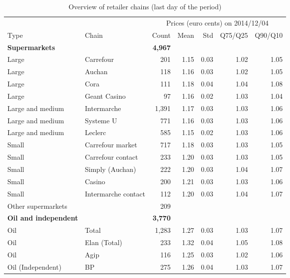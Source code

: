 \documentclass[english]{article}
\begin{document}
\begin{table}[H]
\begin{threeparttable}
\renewcommand{\arraystretch}{0.8} %
\caption{Overview of retailer chains (last day of the period)}
\label{tab:station_chains}
    \begin{tabular}{llrrrrr}
    \hline
		\hline
          &       & \multicolumn{5}{c}{Prices (euro cents) on 2014/12/04} \\
    Type  & Chain & Count & Mean  & Std   & Q75/Q25 & Q90/Q10 \\
		\hline
    \textbf{Supermarkets} &       & \textbf{4,967} &       &       &       &  \\
    Large & Carrefour & 201   & 1.15  & 0.03  & 1.02  & 1.05 \\
    Large & Auchan & 118   & 1.16  & 0.03  & 1.02  & 1.05 \\
    Large & Cora  & 111   & 1.18  & 0.04  & 1.04  & 1.08 \\
    Large & Geant Casino & 97    & 1.16  & 0.02  & 1.03  & 1.04 \\
    Large and medium & Intermarche & 1,391 & 1.17  & 0.03  & 1.03  & 1.06 \\
    Large and medium & Systeme U & 771   & 1.16  & 0.03  & 1.03  & 1.06 \\
    Large and medium & Leclerc & 585   & 1.15  & 0.02  & 1.03  & 1.06 \\
    Small & Carrefour market & 717   & 1.18  & 0.03  & 1.03  & 1.05 \\
    Small & Carrefour contact & 233   & 1.20  & 0.03  & 1.03  & 1.05 \\
    Small & Simply (Auchan) & 222   & 1.20  & 0.03  & 1.04  & 1.07 \\
    Small & Casino & 200   & 1.21  & 0.03  & 1.03  & 1.06 \\
    Small & Intermarche contact & 112   & 1.20  & 0.03  & 1.04  & 1.07 \\
    Other supermarkets &       & 209   &       &       &       &  \\
		\hline
    \textbf{Oil and independent} &       & \textbf{3,770} &       &       &       &  \\
    Oil   & Total & 1,283 & 1.27  & 0.03  & 1.03  & 1.07 \\
    Oil   & Elan (Total) & 233   & 1.32  & 0.04  & 1.05  & 1.08 \\
    Oil   & Agip  & 116   & 1.25  & 0.03  & 1.02  & 1.06 \\
    Oil (Independent) & BP    & 275   & 1.26  & 0.04  & 1.03  & 1.07 \\

\end{tabular}
\end{threeparttable}
\end{table}
\end{document}
